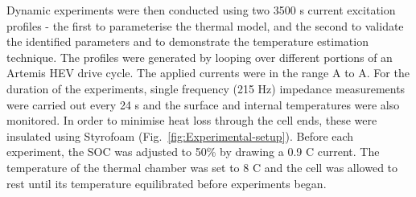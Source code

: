 \documentclass[journal, english]{IEEEtran}
\begin{document}
Dynamic experiments were then conducted using two 3500 s current excitation profiles
- the first to parameterise the thermal model, and the second
to validate the identified
parameters and to demonstrate the temperature estimation technique.
The profiles were generated by looping over different portions of
an Artemis HEV drive cycle.
The applied currents were in the range  A to  A. 
For the duration of the experiments, single
frequency (215 Hz) impedance measurements were carried out every 24
s and the surface and internal temperatures were also monitored. In order
to minimise heat loss through the cell ends, these were insulated using
Styrofoam (Fig.\ \ref{fig:Experimental-setup}). Before each experiment,
the SOC was adjusted to 50\% by drawing a 0.9 C current. The temperature of the thermal chamber was set to 8 C and the
cell was allowed to rest until its temperature equilibrated before experiments began.
\end{document}
